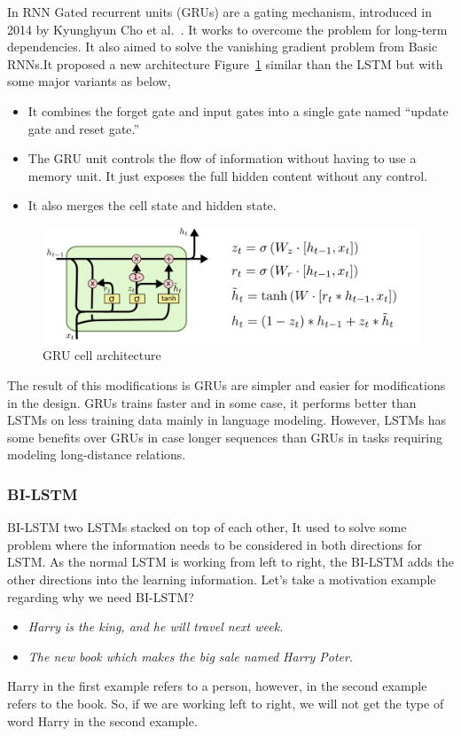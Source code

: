 In RNN Gated recurrent units (GRUs) are a gating mechanism, introduced in 2014 by Kyunghyun Cho et al.~\cite{Cho_et_al}. It works to overcome the problem for long-term dependencies. It also aimed to solve the vanishing gradient problem from Basic RNNs.It proposed a new architecture Figure~\ref{fig:GRU} similar than the LSTM but with some major variants as below,
\begin{itemize}
  
\item It combines the forget gate and input gates into a single gate named “update gate and reset gate.”
\item The GRU unit controls the flow of information without having to use a memory unit. It just exposes the full hidden content without any control.
\item It also merges the cell state and hidden state.
  
\end{itemize}
\begin{figure}[ht!]
  \centering
  \includegraphics[width=\textwidth]{./Figures/Ch_2_Background/GRU.png}
        \caption{GRU cell architecture~\cite{colah}}
        \label{fig:GRU}
      \end{figure}


The result of this modifications is GRUs are simpler and easier for modifications in the design. GRUs trains faster and in some case, it performs better than LSTMs on less training data mainly in language modeling. However, LSTMs has some benefits over GRUs in case longer sequences than GRUs in tasks requiring modeling long-distance relations. 


 
\subsubsection{BI-LSTM}\label{sec_bi-lstm}

BI-LSTM two LSTMs stacked on top of each other, It used to solve some problem where the information needs to be considered in both directions for LSTM. As the normal LSTM is working from left to right, the BI-LSTM adds the other directions into the learning information. Let's take a motivation example regarding why we need BI-LSTM?
\begin{itemize}
\item \textit{Harry is the king, and he will travel next week.}
\item \textit{The new book which makes the big sale named Harry Poter}.
\end{itemize}
Harry in the first example refers to a person, however, in the second example refers to the book. So, if we are working left to right, we will not get the type of word Harry in the second example.

